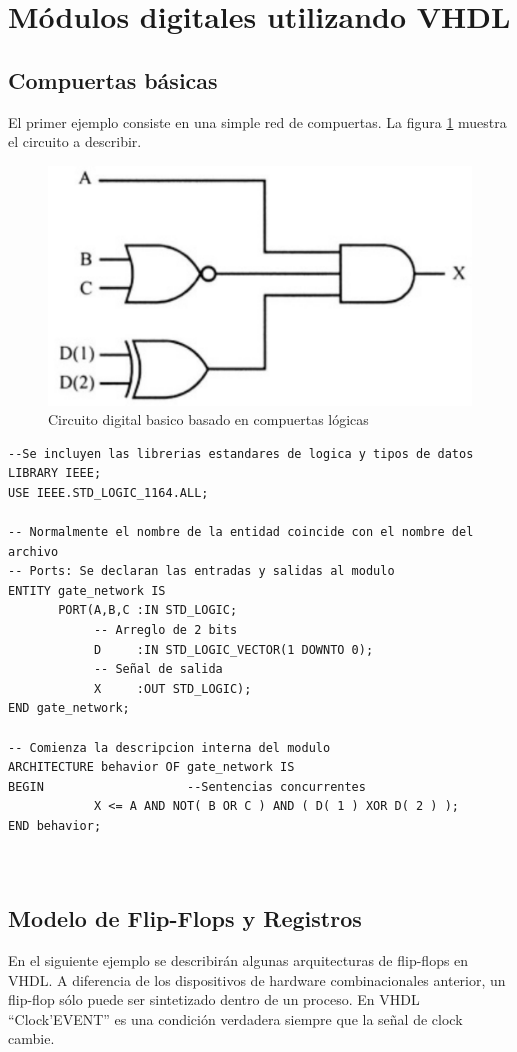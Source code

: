 \section{Módulos digitales utilizando VHDL}
\subsection{Compuertas básicas}
El primer ejemplo consiste en una simple red de compuertas. La figura \ref{compuertas} muestra el circuito a describir.

\begin{figure}[h]
  \centering
    \includegraphics[width=.6\textwidth]{graficos/compuertas.png}
  \caption{Circuito digital basico basado en compuertas lógicas}
  \label{compuertas}
\end{figure}

\begin{lstlisting}[style=vhdl, basicstyle=\footnotesize\ttfamily]
--Se incluyen las librerias estandares de logica y tipos de datos
LIBRARY IEEE;
USE IEEE.STD_LOGIC_1164.ALL;

-- Normalmente el nombre de la entidad coincide con el nombre del archivo
-- Ports: Se declaran las entradas y salidas al modulo
ENTITY gate_network IS  
       PORT(A,B,C :IN STD_LOGIC;
            -- Arreglo de 2 bits
            D     :IN STD_LOGIC_VECTOR(1 DOWNTO 0);
            -- Señal de salida
            X     :OUT STD_LOGIC);
END gate_network;

-- Comienza la descripcion interna del modulo
ARCHITECTURE behavior OF gate_network IS
BEGIN                    --Sentencias concurrentes
            X <= A AND NOT( B OR C ) AND ( D( 1 ) XOR D( 2 ) );
END behavior;

            
\end{lstlisting}

\subsection{Modelo de Flip-Flops y Registros}
En el siguiente ejemplo se describirán algunas arquitecturas de flip-flops en VHDL. 
A diferencia de los dispositivos de hardware combinacionales anterior, un flip-flop sólo puede ser 
sintetizado dentro de un proceso. En VHDL ``Clock’EVENT'' es una condición verdadera siempre que 
la señal de clock cambie.

